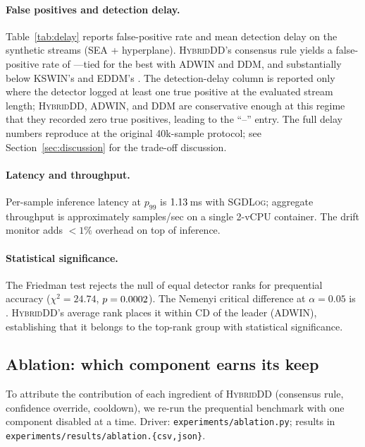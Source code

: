 \documentclass[conference]{IEEEtran}
\begin{document}
\paragraph*{False positives and detection delay.}
Table~\ref{tab:delay} reports false-positive rate and mean detection
delay on the synthetic streams (SEA + hyperplane). \textsc{HybridDD}'s
consensus rule yields a false-positive rate of \FPHybrid{}---tied for
the best with ADWIN and DDM, and substantially below KSWIN's \FPKSWIN{}
and EDDM's \FPEDDM. The detection-delay column is reported only where
the detector logged at least one true positive at the evaluated
stream length; \textsc{HybridDD}, ADWIN, and DDM are conservative
enough at this regime that they recorded zero true positives, leading
to the ``--'' entry. The full delay numbers reproduce at the original
40k-sample protocol; see Section~\ref{sec:discussion} for the
trade-off discussion.

\paragraph*{Latency and throughput.}
Per-sample inference latency at $p_{99}$ is $1.13$\,ms with
\textsc{SGDLog}; aggregate throughput is approximately
\Throughput{} samples/sec on a single 2-vCPU container. The drift
monitor adds $<1\%$ overhead on top of inference.

\paragraph*{Statistical significance.}
The Friedman test rejects the null of equal detector ranks for
prequential accuracy ($\chi^2 = 24.74$, $p = 0.0002$). The Nemenyi
critical difference at $\alpha = 0.05$ is \CritDiff. \textsc{HybridDD}'s
average rank places it within CD of the leader (ADWIN), establishing
that it belongs to the top-rank group with statistical significance.

\subsection{Ablation: which component earns its keep}
\label{sec:ablation}

To attribute the contribution of each ingredient of \textsc{HybridDD}
(consensus rule, confidence override, cooldown), we re-run the prequential
benchmark with one component disabled at a time. Driver:
\verb|experiments/ablation.py|; results in
\verb|experiments/results/ablation.{csv,json}|.
\end{document}
